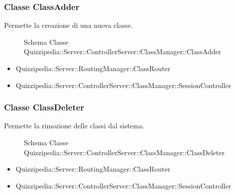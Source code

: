 \subsubsection{Classe ClassAdder}
Permette la creazione di una nuova classe.
\begin{figure}[H]
\centering
\noindent{}
\caption{Schema Classe Quizzipedia::Server::ControllerServer::ClassManager::ClassAdder}
\end{figure}
\begin{itemize}
\item Quizzipedia::Server::RoutingManager::ClassRouter
\end{itemize}
\begin{itemize}
\item Quizzipedia::Server::ControllerServer::ClassManager::SessionController
\end{itemize}
\subsubsection{Classe ClassDeleter}
Permette la rimozione delle classi dal sistema.
\begin{figure}[H]
\centering
\noindent{}
\caption{Schema Classe Quizzipedia::Server::ControllerServer::ClassManager::ClassDeleter}
\end{figure}
\begin{itemize}
\item Quizzipedia::Server::RoutingManager::ClassRouter
\end{itemize}
\begin{itemize}
\item Quizzipedia::Server::ControllerServer::ClassManager::SessionController
\end{itemize}
